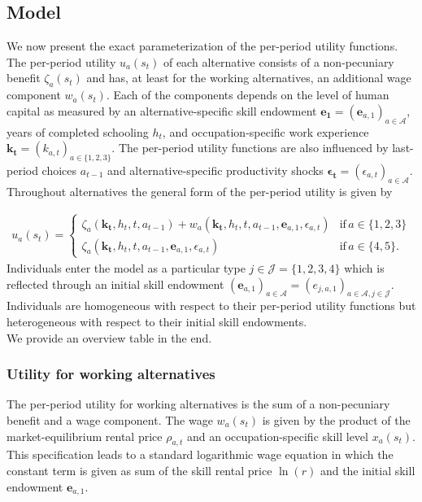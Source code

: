 \subsection{Model}\label{Computational implementation}
We now present the exact parameterization of the per-period utility functions. The per-period utility $u_a(s_t)$ of each alternative consists of a non-pecuniary benefit $\zeta_a(s_t)$ and has, at least for the working alternatives, an additional wage component $w_a(s_t)$. Each of the components depends on the level of human capital as measured by an alternative-specific skill endowment $\bm{e_1} = \left(\bm{e}_{a,1}\right)_{a\in\mathcal{A}}$, years of completed schooling $h_t$, and occupation-specific work experience $\bm{k_t} = \left(k_{a,t}\right)_{a\in\{1, 2, 3\}}$. The per-period utility functions are also influenced by last-period choices $a_{t -1}$ and alternative-specific productivity shocks
$\bm{\epsilon_t} = \left(\epsilon_{a,t}\right)_{a\in\mathcal{A}}$. Throughout alternatives the general form of the per-period utility is given by

\begin{align*}
u_a(s_t) =
\begin{cases}
    \zeta_a(\bm{k_t}, h_t, t, a_{t -1})  + w_a(\bm{k_t}, h_t, t, a_{t -1}, \bm{e}_{a,1}, \epsilon_{a,t})              & \text{if}\, a \in \{1, 2, 3\}  \\
    \zeta_a(\bm{k_t}, h_t, t, a_{t-1}, \bm{e}_{a,1}, \epsilon_{a,t})                                                  &  \text{if}\, a \in \{4, 5\}.
\end{cases}
\end{align*}
%
Individuals enter the model as a particular type $j \in \mathcal{J} = \{1, 2, 3, 4\}$ which is reflected through an initial skill endowment $\left(\bm{e}_{a,1}\right)_{a\in\mathcal{A}} = \left(e_{j,a,1}\right)_{a\in\mathcal{A}, j \in \mathcal{J}}$. Individuals are homogeneous with respect to their per-period utility functions but heterogeneous with respect to their initial skill endowments.\\

\noindent We provide an overview table in the end.
\subsubsection*{Utility for working alternatives}
The per-period utility for working alternatives is the sum of a non-pecuniary benefit and a wage component. The wage $w_{a}(s_t)$ is given by the product of the market-equilibrium rental price $\rho_{a,t}$ and an occupation-specific skill level $x_{a}(s_t)$. This specification leads to a standard logarithmic wage equation in which the constant term is given as sum of the skill rental price $\ln(r)$ and the initial skill endowment $\bm{e}_{a,1}$.\\

